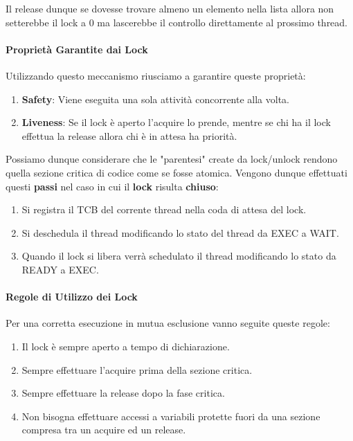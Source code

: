\documentclass{article}
\begin{document}
Il release dunque se dovesse trovare almeno un elemento nella lista allora non setterebbe il lock a $0$ ma lascerebbe il controllo direttamente
al prossimo thread.

\paragraph{Proprietà Garantite dai Lock} Utilizzando questo meccanismo riusciamo a garantire queste proprietà:

\begin{enumerate}
    \item \textbf{Safety}: Viene eseguita una sola attività concorrente alla volta.
    \item \textbf{Liveness}: Se il lock è aperto l'acquire lo prende, mentre se chi ha il lock effettua la release allora chi è in attesa ha priorità.
\end{enumerate}

Possiamo dunque considerare che le "parentesi" create da lock/unlock rendono quella sezione critica di codice come se fosse atomica.
Vengono dunque effettuati questi \textbf{passi} nel caso in cui il \textbf{lock} risulta \textbf{chiuso}:

\begin{enumerate}
    \item Si registra il TCB del corrente thread nella coda di attesa del lock.
    \item Si deschedula il thread modificando lo stato del thread da EXEC a WAIT.
    \item Quando il lock si libera verrà schedulato il thread modificando lo stato da READY a EXEC.
\end{enumerate}

\paragraph{Regole di Utilizzo dei Lock} Per una corretta esecuzione in mutua esclusione vanno seguite queste regole:

\begin{enumerate}
    \item Il lock è sempre aperto a tempo di dichiarazione.
    \item Sempre effettuare l'acquire prima della sezione critica.
    \item Sempre effettuare la release dopo la fase critica.
    \item Non bisogna effettuare accessi a variabili protette fuori da una sezione compresa tra un acquire ed un release.
\end{enumerate}
\end{document}
